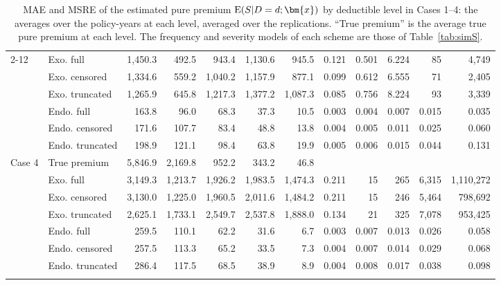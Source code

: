 \begin{table}[!ht]
{{\begin{tabular}{llrrrrrrrrrr}
\cmidrule(lr){2-12}
 & Exo. full & 1,450.3 & 492.5 & 943.4 & 1,130.6 & 945.5 & 0.121 & 0.501 & 6.224 & 85 & 4,749 \\
 & Exo. censored & 1,334.6 & 559.2 & 1,040.2 & 1,157.9 & 877.1 & 0.099 & 0.612 & 6.555 & 71 & 2,405 \\
 & Exo. truncated & 1,265.9 & 645.8 & 1,217.3 & 1,377.2 & 1,087.3 & 0.085 & 0.756 & 8.224 & 93 & 3,339 \\
 & Endo. full & 163.8 & 96.0 & 68.3 & 37.3 & 10.5 & 0.003 & 0.004 & 0.007 & 0.015 & 0.035 \\
 & Endo. censored & 171.6 & 107.7 & 83.4 & 48.8 & 13.8 & 0.004 & 0.005 & 0.011 & 0.025 & 0.060 \\
 & Endo. truncated & 198.9 & 121.1 & 98.4 & 63.8 & 19.9 & 0.005 & 0.006 & 0.015 & 0.044 & 0.131 \\
\midrule
\multirow{7}{*}{Case 4} & True premium & 5,846.9 & 2,169.8 & 952.2 & 343.2 & 46.8 & \multicolumn{5}{c}{} \\
\cmidrule(lr){2-12}
 & Exo. full & 3,149.3 & 1,213.7 & 1,926.2 & 1,983.5 & 1,474.3 & 0.211 & 15 & 265 & 6,315 & 1,110,272 \\
 & Exo. censored & 3,130.0 & 1,225.0 & 1,960.5 & 2,011.6 & 1,484.2 & 0.211 & 15 & 246 & 5,464 & 798,692 \\
 & Exo. truncated & 2,625.1 & 1,733.1 & 2,549.7 & 2,537.8 & 1,888.0 & 0.134 & 21 & 325 & 7,078 & 953,425 \\
 & Endo. full & 259.5 & 110.1 & 62.2 & 31.6 & 6.7 & 0.003 & 0.007 & 0.013 & 0.026 & 0.058 \\
 & Endo. censored & 257.5 & 113.3 & 65.2 & 33.5 & 7.3 & 0.004 & 0.007 & 0.014 & 0.029 & 0.068 \\
 & Endo. truncated & 286.4 & 117.5 & 68.5 & 38.9 & 8.9 & 0.004 & 0.008 & 0.017 & 0.038 & 0.098 \\
\hhline{============}
\end{tabular}
}
}
\caption{MAE and MSRE of the estimated pure premium ${\rm E}(S|D=d;\bm{x})$ by deductible level in Cases 1--4: the averages over the policy-years at each level, averaged over the replications. ``True premium'' is the average true pure premium at each level. The frequency and severity models of each scheme are those of Table~\ref{tab:simS}.}\label{tab:simSbylevel}
\end{table}
